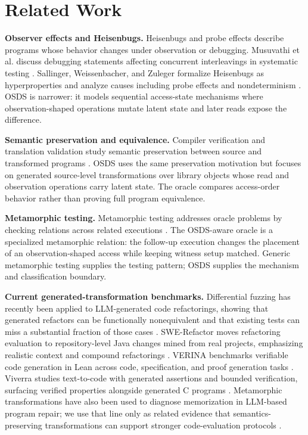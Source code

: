\section{Related Work}

\textbf{Observer effects and Heisenbugs.} Heisenbugs and probe effects describe programs whose behavior changes under observation or debugging. Musuvathi et al. discuss debugging statements affecting concurrent interleavings in systematic testing \citep{musuvathi2008chess}. Sallinger, Weissenbacher, and Zuleger formalize Heisenbugs as hyperproperties and analyze causes including probe effects and nondeterminism \citep{sallinger2026heisenbugs}. OSDS is narrower: it models sequential access-state mechanisms where observation-shaped operations mutate latent state and later reads expose the difference.

\textbf{Semantic preservation and equivalence.} Compiler verification and translation validation study semantic preservation between source and transformed programs \citep{pnueli1998translation,leroy2009compcert}. OSDS uses the same preservation motivation but focuses on generated source-level transformations over library objects whose read and observation operations carry latent state. The oracle compares access-order behavior rather than proving full program equivalence.

\textbf{Metamorphic testing.} Metamorphic testing addresses oracle problems by checking relations across related executions \citep{chen1998metamorphic,chen2018metamorphic}. The OSDS-aware oracle is a specialized metamorphic relation: the follow-up execution changes the placement of an observation-shaped access while keeping witness setup matched. Generic metamorphic testing supplies the testing pattern; OSDS supplies the mechanism and classification boundary.

\textbf{Current generated-transformation benchmarks.} Differential fuzzing has recently been applied to LLM-generated code refactorings, showing that generated refactors can be functionally nonequivalent and that existing tests can miss a substantial fraction of those cases \citep{dristi2026differential}. SWE-Refactor moves refactoring evaluation to repository-level Java changes mined from real projects, emphasizing realistic context and compound refactorings \citep{xu2026swerefactor}. VERINA benchmarks verifiable code generation in Lean across code, specification, and proof generation tasks \citep{ye2025verina}. Viverra studies text-to-code with generated assertions and bounded verification, surfacing verified properties alongside generated C programs \citep{wu2026viverra}. Metamorphic transformations have also been used to diagnose memorization in LLM-based program repair; we use that line only as related evidence that semantics-preserving transformations can support stronger code-evaluation protocols \citep{dekoning2026metamorphic}.

